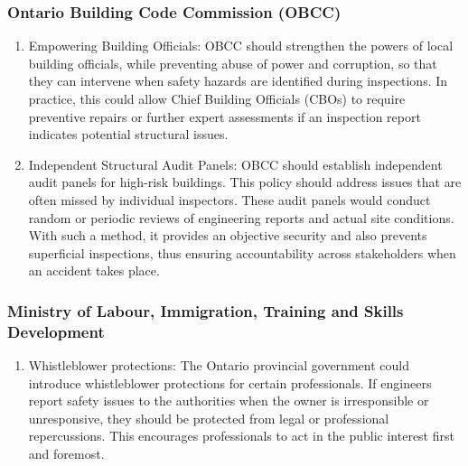 \documentclass[12pt]{article}
\begin{document}
\subsubsection{Ontario Building Code Commission (OBCC)}
\begin{enumerate}
    \item Empowering Building Officials: OBCC should strengthen the powers of local building officials, while preventing abuse of power and corruption, so that they can intervene when safety hazards are identified during inspections. In practice, this could allow Chief Building Officials (CBOs) to require preventive repairs or further expert assessments if an inspection report indicates potential structural issues. 
    
    \item Independent Structural Audit Panels: OBCC should establish independent audit panels for high-risk buildings. This policy should address issues that are often missed by individual inspectors. These audit panels would conduct random or periodic reviews of engineering reports and actual site conditions. With such a method, it provides an objective security and also prevents superficial inspections, thus ensuring accountability across stakeholders when an accident takes place.
\end{enumerate}


\subsubsection{Ministry of Labour, Immigration, Training and Skills Development}
\begin{enumerate}
    \item Whistleblower protections: The Ontario provincial government could introduce whistleblower protections for certain professionals. If engineers report safety issues to the authorities when the owner is irresponsible or unresponsive, they should be protected from legal or professional repercussions. This encourages professionals to act in the public interest first and foremost.
\end{enumerate}
\end{document}
